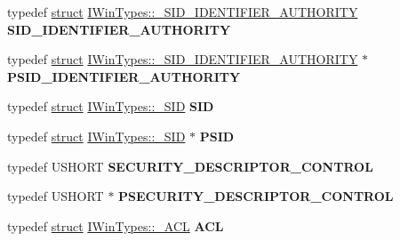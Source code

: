 \begin{DoxyCompactItemize}
typedef \hyperlink{interfacestruct}{struct} \hyperlink{struct_i_win_types_1_1___s_i_d___i_d_e_n_t_i_f_i_e_r___a_u_t_h_o_r_i_t_y}{I\+Win\+Types\+::\+\_\+\+S\+I\+D\+\_\+\+I\+D\+E\+N\+T\+I\+F\+I\+E\+R\+\_\+\+A\+U\+T\+H\+O\+R\+I\+TY} {\bfseries S\+I\+D\+\_\+\+I\+D\+E\+N\+T\+I\+F\+I\+E\+R\+\_\+\+A\+U\+T\+H\+O\+R\+I\+TY}
\item 
\mbox{\label{interface_i_win_types_a39ac4a0547644b4760c69747c6d81f1b}} 
typedef \hyperlink{interfacestruct}{struct} \hyperlink{struct_i_win_types_1_1___s_i_d___i_d_e_n_t_i_f_i_e_r___a_u_t_h_o_r_i_t_y}{I\+Win\+Types\+::\+\_\+\+S\+I\+D\+\_\+\+I\+D\+E\+N\+T\+I\+F\+I\+E\+R\+\_\+\+A\+U\+T\+H\+O\+R\+I\+TY} $\ast$ {\bfseries P\+S\+I\+D\+\_\+\+I\+D\+E\+N\+T\+I\+F\+I\+E\+R\+\_\+\+A\+U\+T\+H\+O\+R\+I\+TY}
\item 
\mbox{\label{interface_i_win_types_a9a3811d6ce0dbe0d0bb0c8381ea954bb}} 
typedef \hyperlink{interfacestruct}{struct} \hyperlink{struct_i_win_types_1_1___s_i_d}{I\+Win\+Types\+::\+\_\+\+S\+ID} {\bfseries S\+ID}
\item 
\mbox{\label{interface_i_win_types_ae31850a8b402ac73c10dbc3465d01cd7}} 
typedef \hyperlink{interfacestruct}{struct} \hyperlink{struct_i_win_types_1_1___s_i_d}{I\+Win\+Types\+::\+\_\+\+S\+ID} $\ast$ {\bfseries P\+S\+ID}
\item 
\mbox{\label{interface_i_win_types_aaa4304267060c355d35bc7d6a3499c59}} 
typedef U\+S\+H\+O\+RT {\bfseries S\+E\+C\+U\+R\+I\+T\+Y\+\_\+\+D\+E\+S\+C\+R\+I\+P\+T\+O\+R\+\_\+\+C\+O\+N\+T\+R\+OL}
\item 
\mbox{\label{interface_i_win_types_a3d8e3ef9744fb2f883578935e9edf5c8}} 
typedef U\+S\+H\+O\+RT $\ast$ {\bfseries P\+S\+E\+C\+U\+R\+I\+T\+Y\+\_\+\+D\+E\+S\+C\+R\+I\+P\+T\+O\+R\+\_\+\+C\+O\+N\+T\+R\+OL}
\item 
\mbox{\label{interface_i_win_types_ae2aee828e6768568a8b6b8d5cb6f3b57}} 
typedef \hyperlink{interfacestruct}{struct} \hyperlink{struct_i_win_types_1_1___a_c_l}{I\+Win\+Types\+::\+\_\+\+A\+CL} {\bfseries A\+CL}
\item 
\mbox{\label{interface_i_win_types_ab4dff95f44256ccf7252dbb70872cfe3}} 

\end{DoxyCompactItemize}
